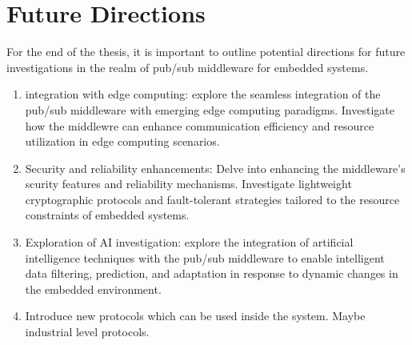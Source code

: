 
\chapter{Future Directions}

For the end of the thesis, it is important to outline potential directions for
future investigations in the realm of pub/sub middleware for embedded systems.

\begin{enumerate}
    \item   integration with edge computing:
            explore the seamless integration of the pub/sub middleware with
            emerging edge computing paradigms. Investigate how the middlewre
            can enhance communication efficiency and resource utilization in
            edge computing scenarios.
    \item   Security and reliability enhancements:
            Delve into enhancing the middleware's scurity features and
            reliability mechanisms. Investigate lightweight cryptographic
            protocols and fault-tolerant strategies tailored to the resource
            constraints of embedded systems.
    \item   Exploration of AI investigation:
            explore the integration of artificial intelligence techniques with
            the pub/sub middleware to enable intelligent data filtering,
            prediction, and adaptation in response to dynamic changes in the
            embedded environment.
    \item   Introduce new protocols which can be used inside the system. Maybe
            industrial level protocols.
\end{enumerate}
